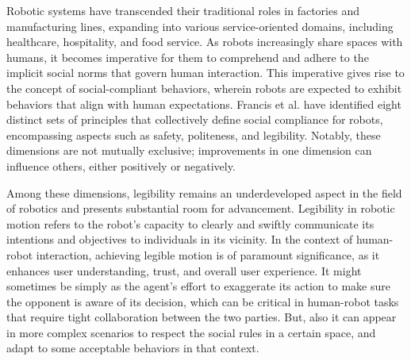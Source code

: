 


Robotic systems have transcended their traditional roles in factories and manufacturing lines, expanding into various service-oriented domains, including healthcare, hospitality, and food service. As robots increasingly share spaces with humans, it becomes imperative for them to comprehend and adhere to the implicit social norms that govern human interaction. This imperative gives rise to the concept of social-compliant behaviors, wherein robots are expected to exhibit behaviors that align with human expectations.
%
Francis et al. \cite{francis2023principles} have identified eight distinct sets of principles that collectively define social compliance for robots, encompassing aspects such as safety, politeness, and legibility. Notably, these dimensions are not mutually exclusive; improvements in one dimension can influence others, either positively or negatively.

Among these dimensions, legibility remains an underdeveloped aspect in the field of robotics and presents substantial room for advancement. Legibility in robotic motion refers to the robot's capacity to clearly and swiftly communicate its intentions and objectives to individuals in its vicinity. In the context of human-robot interaction, achieving legible motion is of paramount significance, as it enhances user understanding, trust, and overall user experience.
%
It might sometimes be simply as the agent's effort to exaggerate its action to make sure the opponent is aware of its decision, which can be critical in human-robot tasks that require tight collaboration between the two parties. But, also it can appear in more complex scenarios to respect the social rules in a certain space, and adapt to some acceptable behaviors in that context.

